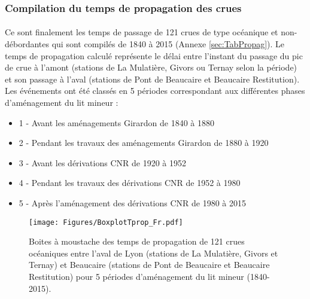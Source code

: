 \documentclass[11pt]{article}
\begin{document}
	
\FloatBarrier
	\subsubsection{Compilation du temps de propagation des crues}

	
	\paragraph{} Ce sont finalement les temps de passage de 121 crues de type océanique et non-débordantes qui sont compilés de 1840 à 2015 (Annexe \ref{sec:TabPropag}). Le temps de propagation calculé représente le délai entre l'instant du passage du pic de crue à l'amont (stations de La Mulatière, Givors ou Ternay selon la période) et son passage à l'aval (stations de Pont de Beaucaire et Beaucaire Restitution). Les événements ont été classés en 5 périodes correspondant aux différentes phases d'aménagement du lit mineur : 
	\begin{itemize}
		\item 1 - Avant les aménagements Girardon de 1840 à 1880
		\item 2 - Pendant les travaux des aménagements Girardon de 1880 à 1920
		\item 3 - Avant les dérivations CNR de 1920 à 1952
		\item 4 - Pendant les travaux des dérivations CNR de 1952 à 1980
		\item 5 - Après l'aménagement des dérivations CNR de 1980 à 2015
	\end{itemize}

	\begin{figure}[h!]
		\centering
			\texttt{[image: Figures/BoxplotTprop\_Fr.pdf]}
	        \caption{Boites à moustache des temps de propagation de 121 crues océaniques entre l'aval de Lyon (stations de La Mulatière, Givors et Ternay) et Beaucaire (stations de Pont de Beaucaire et Beaucaire Restitution) pour 5 périodes d'aménagement du lit mineur (1840-2015).}
			\label{fig:BoxplotPropag}
		\end{figure}	
\end{document}
